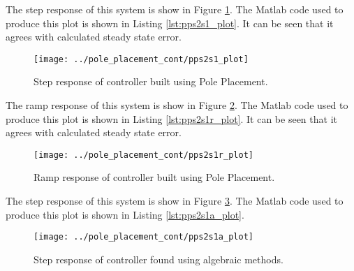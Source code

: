 \documentclass{article}
\newcommand{\sincludepdf}[2][]{
	
}
\begin{document}
\sincludepdf[pages={5}]{scan/11241301.pdf}

The step response of this system is show in Figure \ref{fig:pps2s1_plot}.
The Matlab code used to produce this plot is shown
in Listing \ref{lst:pps2s1_plot}.
It can be seen that it agrees with calculated steady state error.

\begin{figure}[h!]
\begin{center}
\texttt{[image: ../pole\_placement\_cont/pps2s1\_plot]}
\end{center}
\caption{Step response of controller built using Pole Placement.}
\label{fig:pps2s1_plot}
\end{figure}



\sincludepdf[pages={4}]{scan/11241301.pdf}

The ramp response of this system is show in Figure \ref{fig:pps2s1r_plot}.
The Matlab code used to produce this plot is shown
in Listing \ref{lst:pps2s1r_plot}.
It can be seen that it agrees with calculated steady state error.

\begin{figure}[h!]
\begin{center}
\texttt{[image: ../pole\_placement\_cont/pps2s1r\_plot]}
\end{center}
\caption{Ramp response of controller built using Pole Placement.}
\label{fig:pps2s1r_plot}
\end{figure}



\clearpage
\sincludepdf[pages={4},
			pagecommand=\subsection*{Example 2}
	]{scan/11231301.pdf}

The step response of this system is show in Figure \ref{fig:pps2s1a_plot}.
The Matlab code used to produce this plot is shown
in Listing \ref{lst:pps2s1a_plot}.

\begin{figure}[h!]
\begin{center}
\texttt{[image: ../pole\_placement\_cont/pps2s1a\_plot]}
\end{center}
\caption{Step response of controller found using algebraic methods.}
\label{fig:pps2s1a_plot}
\end{figure}
\end{document}
